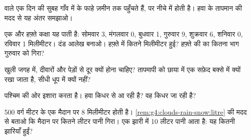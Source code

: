 \begin{exercise}[$\star\star$]\label{exo:g4:clouds-rain-snow:7}
 वाले एक दिन की सुबह  गाँव में  के फाहे ज़मीन तक पहुँचते हैं, पर
नीचे  में  होती है। हवा के तापमान की मदद से यह अंतर समझाओ।
\end{exercise}

\begin{exercise}[$\star\star$]\label{exo:g4:clouds-rain-snow:8}
एक और हफ़्ते कक्षा यह पाती है: सोमवार 3, मंगलवार 0, बुधवार 1, गुरुवार 9,
शुक्रवार 6, शनिवार 0, रविवार 1 मिलीमीटर। दंड आलेख बनाओ। हफ़्ते में कितने
मिलीमीटर  हुई? हफ़्ते की  का कितना भाग गुरुवार को गिरा?
\end{exercise}

\begin{exercise}[$\star\star$]\label{exo:g4:clouds-rain-snow:9}
 खुली जगह में, दीवारों और पेड़ों से दूर क्यों होना चाहिए? तापमापी को
छाया में एक सफ़ेद बक्से में क्यों रखा जाता है, सीधी धूप में क्यों नहीं?
\end{exercise}

\begin{exercise}[$\star\star$]\label{exo:g4:clouds-rain-snow:10}
 पश्चिम की ओर इशारा करता है। हवा किधर से आ रही है? वह किधर जा
रही है?
\end{exercise}

\begin{exercise}[$\star\star\star$]\label{exo:g4:clouds-rain-snow:11}
500 वर्ग मीटर के एक मैदान पर 8 मिलीमीटर  होती है।
\cref{rem:g4:clouds-rain-snow:litre} की मदद से बताओ कि मैदान पर कितने लीटर
पानी गिरा। एक झारी में 10 लीटर पानी आता है: यह कितनी झारियाँ हुईं?
\end{exercise}
